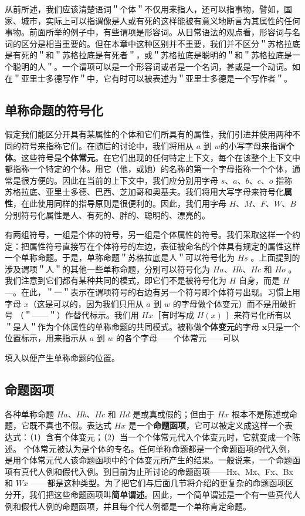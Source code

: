 从前所述，我们应该清楚语词＂个体＂不仅用来指人，还可以指事物，譬如，国家、城市，实际上可以指谓像是人或有死的这样能被有意义地断言为其属性的任何事物。前面所举的例子中，有些谓项是形容词。从日常语法的观点看，形容词与名词的区分是相当重要的。但在本章中这种区别并不重要，我们并不区分＂苏格拉底是有死的＂和＂苏格拉底是有死者＂，或＂苏格拉底是聪明的＂和＂苏格拉底是一个聪明的人＂。一个谓项可以是一个形容词或者是一个名词，甚或是一个动词。如在＂亚里士多德写作＂中，它有时可以被表述为＂亚里士多德是一个写作者＂。

\subsection{单称命题的符号化}

假定我们能区分开具有某属性的个体和它们所具有的属性，我们引进并使用两种不同的符号来指称它们。在随后的讨论中，我们将用从 $a$ 到 $w$的小写字母来指谓\textbf{个体}。这些符号是\textbf{个体常元}。在它们出现的任何特定上下文，每个在该整个上下文中都指称一个特定的个体。用它（他，或她）的名称的第一个字母指称一个个体，通常是很方便的。因此在当前的上下文中，我们应分别用字母 $s 、 a 、 b 、 c 、 o$ 指称苏格拉底、亚里士多德、巴西、芝加哥和奥基夫。我们将用大写字母来符号化\textbf{属性}，在此使用同样的指导原则是很便利的。因此，我们用字母 $H 、 M 、 F 、 W 、 B$ 分别符号化属性是人、有死的、胖的、聪明的、漂亮的。

有两组符号，一组是个体的符号，另一组是个体属性的符号。我们采取这样一个约定：把属性符号直接写在个体符号的左边，表征被命名的个体具有规定的属性这样一个单称命题。于是，单称命题＂苏格拉底是人＂可以符号化为 $H s$ 。上面提到的涉及谓项＂人＂的其他一些单称命题，分别可以符号化为 $H a 、 H b 、 H c$ 和 $H o$ 。我们注意到它们都有某种共同的模式，即它们不是被符号化为 $H$ 自身，而是 $H$ —。在此，＂一＂表示在谓项符号的右边有另一个符号即个体符号出现。习惯上用字母 $x$（这是可以的，因为我们只用从 $a$ 到 $w$ 的字母做个体变元）而不是用破折号 （＂——＂）作替代标示。我们用 $H x$［有时写成 $H(x)$ ］来符号化所有以 ＂是人＂作为个体属性的单称命题的共同模式。被称做\textbf{个体变元}的字母 $\boldsymbol{x}$只是一个位置标示，用来指示从 $a$ 到 $w$ 的各个字母——个体常元——可以

填入以便产生单称命题的位置。

\subsection{命题函项}

各种单称命题 $H a 、 H b 、 H c$ 和 $H d$ 是或真或假的；但由于 $H x$ 根本不是陈述或命题，它既不真也不假。表达式 $H x$ 是一个\textbf{命题函项}，它可以被定义成这样一个表达式：（1）含有个体变元；（2）当一个个体常元代入个体变元时，它就变成一个陈述。\cite{reichenbach1947} 个体常元被认为是个体的专名。任何单称命题都是一个命题函项的代入例，是用个体常元代人该命题函项中的个体变元所产生的结果。一般说来，一个命题函项有真代人例和假代入例。到目前为止所讨论的命题函项——Hx、Mx、Fx、Bx 和 $W x$ ——都是这种类型。为了把它们与后面几节将介绍的更复杂的命题函项区分开，我们把这些命题函项叫\textbf{简单谓述}。因此，一个简单谓述是一个有一些真代人例和假代人例的命题函项，并且每个代人例都是一个单称肯定命题。 

